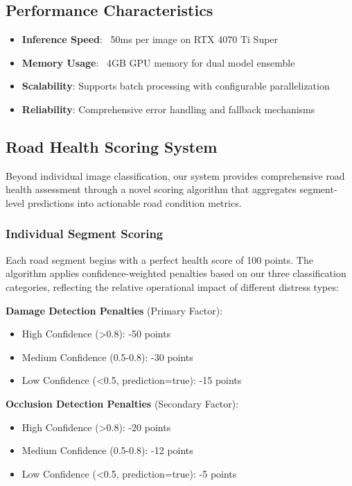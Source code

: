 \documentclass[12pt]{article}
\begin{document}
\subsection{Performance Characteristics}

\begin{itemize}[itemsep=1pt,parsep=0pt,topsep=3pt]
\item \textbf{Inference Speed}: ~50ms per image on RTX 4070 Ti Super
\item \textbf{Memory Usage}: ~4GB GPU memory for dual model ensemble
\item \textbf{Scalability}: Supports batch processing with configurable parallelization
\item \textbf{Reliability}: Comprehensive error handling and fallback mechanisms
\end{itemize}

\subsection{Road Health Scoring System}

Beyond individual image classification, our system provides comprehensive road health assessment through a novel scoring algorithm that aggregates segment-level predictions into actionable road condition metrics.

\subsubsection{Individual Segment Scoring}

Each road segment begins with a perfect health score of 100 points. The algorithm applies confidence-weighted penalties based on our three classification categories, reflecting the relative operational impact of different distress types:

\textbf{Damage Detection Penalties} (Primary Factor):
\begin{itemize}[itemsep=1pt,parsep=0pt,topsep=2pt]
\item High Confidence (>0.8): -50 points
\item Medium Confidence (0.5-0.8): -30 points
\item Low Confidence (<0.5, prediction=true): -15 points
\end{itemize}

\textbf{Occlusion Detection Penalties} (Secondary Factor):
\begin{itemize}[itemsep=1pt,parsep=0pt,topsep=2pt]
\item High Confidence (>0.8): -20 points
\item Medium Confidence (0.5-0.8): -12 points
\item Low Confidence (<0.5, prediction=true): -5 points
\end{itemize}
\end{document}

